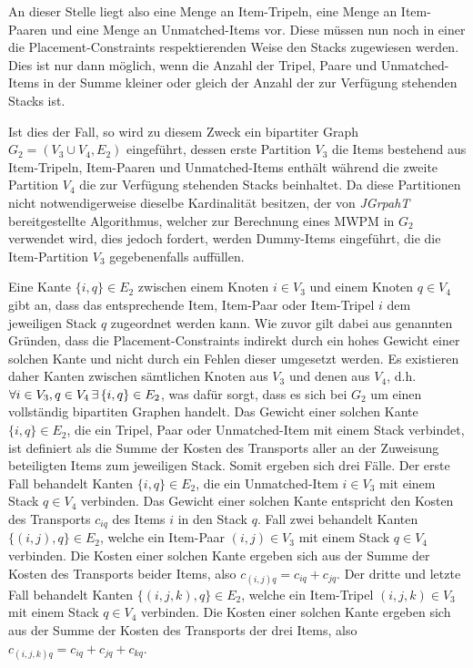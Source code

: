 An dieser Stelle liegt also eine Menge an Item-Tripeln, eine Menge an Item-Paaren und eine Menge an Unmatched-Items vor. Diese müssen nun
noch in einer die Placement-Constraints respektierenden Weise den Stacks zugewiesen werden.
Dies ist nur dann möglich, wenn die Anzahl der Tripel, Paare und Unmatched-Items in der Summe kleiner oder gleich der Anzahl
der zur Verfügung stehenden Stacks ist.

Ist dies der Fall, so wird zu diesem Zweck ein bipartiter Graph $G_2 = (V_3 \cup V_4, E_2)$ eingeführt,
dessen erste Partition $V_3$ die Items bestehend aus Item-Tripeln, Item-Paaren und Unmatched-Items enthält während die zweite Partition $V_4$
die zur Verfügung stehenden Stacks beinhaltet. Da diese Partitionen nicht notwendigerweise dieselbe Kardinalität besitzen, der von \textit{JGrpahT} bereitgestellte Algorithmus, welcher zur Berechnung eines \textsc{MWPM} in $G_2$ verwendet wird, dies jedoch fordert, werden Dummy-Items
eingeführt, die die Item-Partition $V_3$ gegebenenfalls auffüllen.


Eine Kante $\{i, q\} \in E_2$ zwischen einem Knoten $i \in V_3$ und einem Knoten $q \in V_4$ gibt an, dass das entsprechende Item, Item-Paar oder Item-Tripel $i$ dem jeweiligen Stack $q$ zugeordnet werden kann. Wie zuvor gilt dabei
aus genannten Gründen, dass die Placement-Constraints indirekt durch ein hohes Gewicht einer solchen Kante und nicht durch ein Fehlen dieser
umgesetzt werden. Es existieren daher Kanten zwischen sämtlichen Knoten aus $V_3$ und denen aus $V_4$, d.h. $\forall i \in V_3, q \in V_4
\thinspace \exists \thinspace \{i, q\} \in E_2$, was dafür sorgt, dass es sich bei $G_2$ um einen vollständig bipartiten Graphen handelt.
Das Gewicht einer solchen Kante $\{i, q\} \in E_2$, die ein Tripel, Paar oder Unmatched-Item mit einem Stack verbindet, ist definiert
als die Summe der Kosten des Transports aller an der Zuweisung beteiligten Items zum jeweiligen Stack. Somit ergeben sich drei Fälle.
Der erste Fall behandelt Kanten $\{i, q\} \in E_2$, die ein Unmatched-Item $i \in V_3$ mit einem Stack $q \in V_4$ verbinden.
Das Gewicht einer solchen Kante entspricht den Kosten des Transports $c_{iq}$ des Items $i$ in den Stack $q$.
Fall zwei behandelt Kanten $\{(i, j), q\} \in E_2$, welche ein Item-Paar $(i, j) \in V_3$ mit einem Stack $q \in V_4$
verbinden. Die Kosten einer solchen Kante ergeben sich aus der Summe der Kosten des Transports beider Items,
also $c_{(i, j)q} = c_{iq} + c_{jq}$.
Der dritte und letzte Fall behandelt Kanten $\{(i, j, k), q\} \in E_2$, welche ein Item-Tripel $(i, j, k) \in V_3$
mit einem Stack $q \in V_4$ verbinden. Die Kosten einer solchen Kante ergeben sich aus der Summe der Kosten des Transports
der drei Items, also $c_{(i, j, k)q} = c_{iq} + c_{jq} + c_{kq}$.

